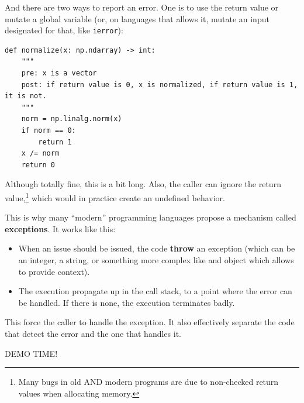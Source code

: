 \documentclass[10pt,
aspectratio=169
]{beamer}
\begin{document}
\begin{frame}[fragile]
	And there are two ways to report an error. One is to use the return value or mutate a global variable (or, on languages that allows it, mutate an input designated for that, like \texttt{ierror}):\begin{verbatim}
def normalize(x: np.ndarray) -> int:
	"""
	pre: x is a vector
	post: if return value is 0, x is normalized, if return value is 1, it is not.
	"""
	norm = np.linalg.norm(x)
	if norm == 0:
		return 1
	x /= norm
	return 0
	\end{verbatim}
Although totally fine, this is a bit long. Also, the caller can ignore the return value,\footnote{Many bugs in old AND modern programs are due to non-checked return values when allocating memory.} which would in practice create an undefined behavior.
\vspace{1em}
\end{frame}

\begin{frame}
	This is why many ``modern'' programming languages propose a mechanism called \textbf{exceptions}.  It works like this:\begin{itemize}
		\item When an issue should be issued, the code \textbf{throw} an exception (which can be an integer, a string, or something more complex like and object which allows to provide context).
		\item The execution propagate up in the call stack, to a point where the error can be handled. If there is none, the execution terminates badly.
	\end{itemize}
	This force the caller to handle the exception. It also effectively separate the code that detect the error and the one that handles it.
\end{frame}

\begin{frame}
	\begin{center}
		{\LARGE DEMO TIME!}
	\end{center}
\end{frame}
\end{document}
